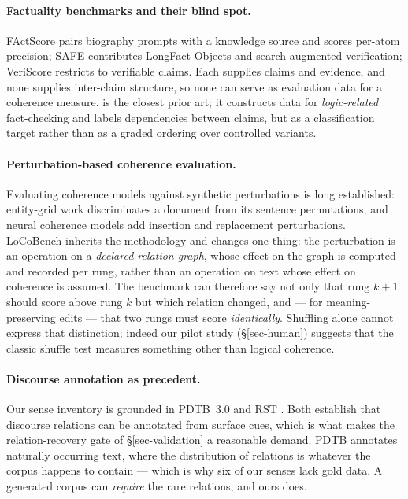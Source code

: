 \paragraph{Factuality benchmarks and their blind spot.} FActScore \citep{factscore} pairs biography
prompts with a knowledge source and scores per-atom precision; SAFE \citep{safe} contributes
LongFact-Objects and search-augmented verification; VeriScore \citep{veriscore} restricts to verifiable
claims. Each supplies claims and evidence, and none supplies inter-claim structure, so none can serve as
evaluation data for a coherence measure. \citet{lorefact} is the closest prior art; it constructs data for
\emph{logic-related} fact-checking and labels dependencies between claims, but as a classification target
rather than as a graded ordering over controlled variants.

\paragraph{Perturbation-based coherence evaluation.} Evaluating coherence models against synthetic
perturbations is long established: entity-grid work \citep{barzilay} discriminates a document from its
sentence permutations, and neural coherence models \citep{li} add insertion and replacement perturbations.
LoCoBench inherits the methodology and changes one thing: the perturbation is an operation on a
\emph{declared relation graph}, whose effect on the graph is computed and recorded per rung, rather than an
operation on text whose effect on coherence is assumed. The benchmark can therefore say not only that rung
$k{+}1$ should score above rung $k$ but which relation changed, and --- for meaning-preserving edits ---
that two rungs must score \emph{identically}. Shuffling alone cannot express that distinction; indeed our
pilot study (\S\ref{sec-human}) suggests that the classic shuffle test measures something other than
logical coherence.

\paragraph{Discourse annotation as precedent.} Our sense inventory is grounded in PDTB~3.0 \citep{pdtb}
and RST \citep{mann}. Both establish that discourse relations can be annotated from surface cues, which is
what makes the relation-recovery gate of \S\ref{sec-validation} a reasonable demand. PDTB annotates
naturally occurring text, where the distribution of relations is whatever the corpus happens to contain ---
which is why six of our senses lack gold data. A generated corpus can \emph{require} the rare relations,
and ours does.

